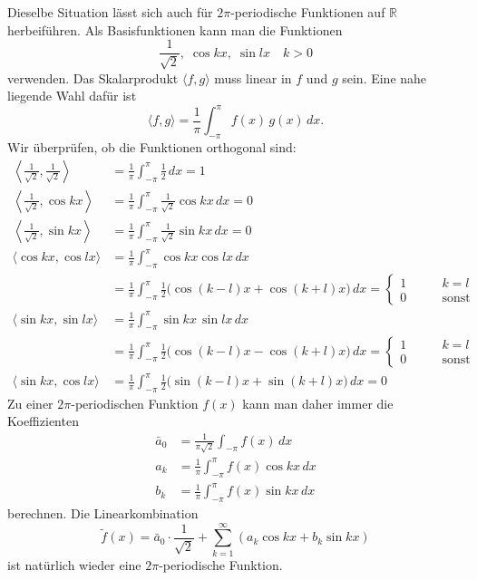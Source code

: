 Dieselbe Situation lässt sich auch für $2\pi$-periodische Funktionen 
auf $\mathbb R$ herbeiführen.
Als Basisfunktionen kann man die Funktionen 
\begin{equation}
\frac{1}{\!\sqrt{2}},\; \cos kx,\; \sin lx\quad k>0
\label{fourier:basis}
\end{equation}
verwenden.
Das Skalarprodukt $\langle f,g\rangle$ muss linear in $f$ und $g$ sein.
Eine nahe liegende Wahl dafür ist
\[
\langle f, g\rangle
=
\frac{1}{\pi}\int_{-\pi}^{\pi} f(x)\,g(x)\,dx.
\]
Wir überprüfen, ob die Funktionen orthogonal sind:
\begin{align*}
\left\langle \frac1{\!\sqrt{2}},\frac1{\!\sqrt{2}}\right\rangle
&=
\frac1{\pi}
\int_{-\pi}^{\pi} \frac12\,dx
=
1
\\
\left\langle \frac1{\!\sqrt{2}},\cos kx\right\rangle
&=
\frac1{\pi}\int_{-\pi}^{\pi}
\frac1{\!\sqrt{2}}\cos kx
\,dx
=0
\\
\left\langle \frac1{\!\sqrt{2}},\sin kx\right\rangle
&=
\frac1{\pi}\int_{-\pi}^{\pi}
\frac1{\!\sqrt{2}}\sin kx
\,dx
=0
\\
\langle \cos kx,\cos lx\rangle
&=
\frac1{\pi}
\int_{-\pi}^\pi \cos kx\cos lx\,dx
\\
&=
\frac1{\pi}
\int_{-\pi}^\pi
\frac12\bigl(
\cos (k-l)x+\cos (k+l)x
\bigr)
\,dx
=
\begin{cases}
1&\qquad k=l\\
0&\qquad\text{sonst}
\end{cases}
\\
\langle \sin kx,\sin lx\rangle
&=
\frac1{\pi}
\int_{-\pi}^\pi \sin kx\,\sin lx\,dx
\\
&=
\frac1{\pi}
\int_{-\pi}^\pi
\frac12
\bigl(
\cos (k-l)x - \cos (k+l)x
\bigr)
\,dx
=
\begin{cases}
1&\qquad k=l\\
0&\qquad\text{sonst}
\end{cases}
\\
\langle \sin kx,\cos lx\rangle
&=
\frac1{\pi}
\int_{-\pi}^{\pi} 
\frac12\bigl(
\sin (k-l)x + \sin (k+l)x
\bigr)
\,dx
=0
\end{align*}
Zu einer $2\pi$-periodischen Funktion $f(x)$ kann man daher immer
die Koeffizienten
\begin{equation}
\begin{aligned}
\bar{a}_0&=\frac1{\pi\!\sqrt{2}}\int_{-\pi}f(x)\,dx
\\
a_k&=\frac1{\pi}\int_{-\pi}^\pi f(x)\cos kx\,dx
\\
b_k&=\frac1{\pi}\int_{-\pi}^\pi f(x)\sin kx\,dx
\end{aligned}
\label{fourier:normalekoeffizienten}
\end{equation}
berechnen.
Die Linearkombination
\begin{equation}
\tilde f(x)
=
\bar{a}_0\cdot\frac1{\!\sqrt{2}}
+ 
\sum_{k=1}^\infty (a_k\cos kx+b_k\sin kx)
\label{fourier:reihe}
\end{equation}
ist natürlich wieder eine $2\pi$-periodische Funktion.

